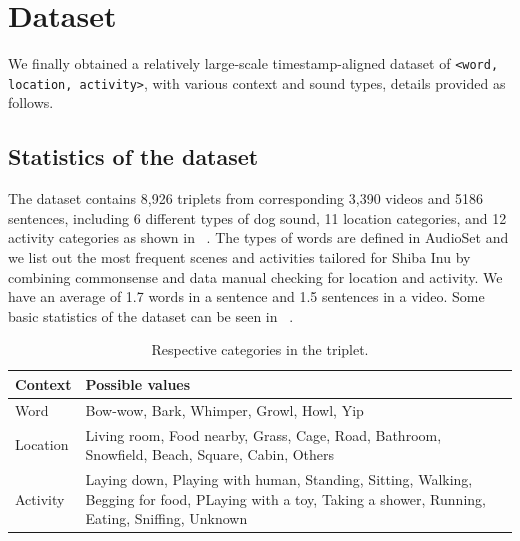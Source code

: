 \section{Dataset}
We finally obtained a relatively large-scale timestamp-aligned dataset of \texttt{<word, location, activity>}, with various context and sound types, details provided as follows. 

\subsection{Statistics of the dataset}
The dataset contains 8,926 triplets from corresponding 3,390 videos and 5186 sentences, including 6 different types of dog sound, 11 location categories, and 12 activity categories as shown in ~. The types of words are defined in AudioSet and we list out the most frequent scenes and activities tailored for Shiba Inu by combining commonsense and data manual checking for location and activity. We have an average of 1.7 words in a sentence and 1.5 sentences in a video. Some basic statistics of the dataset can be seen in ~.

\begin{table}[th]
	\small
	\begin{tabular}{p{}|p{}}
		\toprule
		\textbf{Context} & \textbf{Possible values} \\ \midrule
		Word & Bow-wow, Bark, Whimper, Growl, Howl, Yip \\ \midrule
		Location & Living room, Food nearby, Grass, Cage, Road, Bathroom, Snowfield, Beach, Square, Cabin, Others    \\ \midrule
		Activity & Laying down, Playing with human, Standing, Sitting, Walking, Begging for food, PLaying with a toy, Taking a shower, Running, Eating, Sniffing, Unknown \\ 
		\bottomrule
	\end{tabular}
	\caption{Respective categories in the triplet.}
	\label{tab:dataset}
\end{table}

